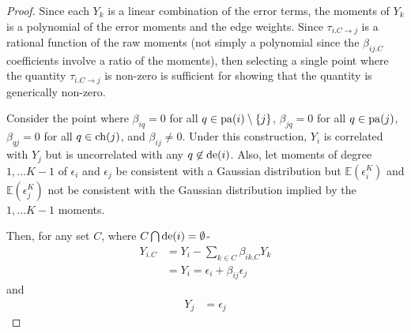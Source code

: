 \documentclass[]{article}
\newcommand{\E}{\mathbb{E}}
\newcommand{\de}{{\rm de}}       %
\newcommand{\ch}{{\rm ch}}       %
\newcommand{\pa}{{\rm pa}}       %
\begin{document}
\begin{proof}
Since each $Y_k$ is a linear combination of the error terms, the moments of $Y_k$ is a polynomial of the error moments and the edge weights. Since $\tau _{i.C\rightarrow j}$ is a rational function of the raw moments (not simply a polynomial since the $\beta_{ij.C}$ coefficients involve a ratio of the moments), then selecting a single point where the  quantity $\tau_{i.C \rightarrow j}$ is non-zero is sufficient for showing that the quantity is generically non-zero.

Consider the point where $\beta_{iq} = 0$ for all $q \in \pa(i)\setminus \{j\}$, $\beta_{jq} = 0$ for all $q \in \pa(j)$, $\beta_{qj} = 0$ for all $q \in \ch(j)$, and $\beta_{ij} \neq 0$. Under this construction, $Y_i$ is correlated with $Y_j$ but is uncorrelated with any $q \not \in \de(i)$. Also, let moments of degree $1, \ldots K-1$ of $\epsilon_i$ and $\epsilon_j$ be consistent with a Gaussian distribution but $\E(\epsilon_i^K)$ and $\E(\epsilon_j^K)$ not be consistent with the Gaussian distribution implied by the $1, \ldots K-1$ moments.

Then, for any set $C$, where $C \bigcap \de(i) = \emptyset$-
\begin{equation}
\begin{aligned}
Y_{i.C} &= Y_i - \sum_{k \in C}\beta_{ik.C}Y_{k}\\
& = Y_i = \epsilon_i + \beta_{ij}\epsilon_j
\end{aligned}
\end{equation}
and
\begin{equation}
\begin{aligned}
Y_{j} &= \epsilon_j
\end{aligned}
\end{equation}


\end{proof}
\end{document}
